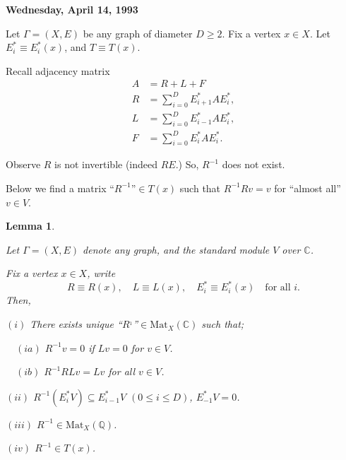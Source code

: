 \documentclass[
]{book}
\newtheorem{lemma}{Lemma}[chapter]
\theoremstyle{definition}
\theoremstyle{definition}
\theoremstyle{definition}
\theoremstyle{definition}
\theoremstyle{remark}
\begin{document}
\textbf{Wednesday, April 14, 1993}

Let \(\Gamma = (X, E)\) be any graph of diameter \(D\geq 2\). Fix a vertex \(x\in X\). Let \(E^*_i\equiv E^*_i(x)\), and \(T \equiv T(x)\).

Recall adjacency matrix
\begin{align}
A & = R + L + F\\
R & = \sum_{i=0}^D E^*_{i+1}AE^*_i,\\
L & = \sum_{i=0}^D E^*_{i-1}AE^*_i,\\
F & = \sum_{i=0}^D E^*_{i}AE^*_i.
\end{align}

Observe \(R\) is not invertible (indeed \(RE%
\).)
So, \(R^{-1}\) does not exist.

Below we find a matrix ``\(R^{-1}\)''\(\in T(x)\) such that \(R^{-1}Rv = v\) for ``almost all'' \(v\in V\).

\begin{lemma}
\protect\hypertarget{lem:inverse-of-r}{}\label{lem:inverse-of-r}

Let \(\Gamma = (X, E)\) denote any graph, and the standard module \(V\) over \(\mathbb{C}\).

Fix a vertex \(x\in X\), write
\[R\equiv R(x), \quad L \equiv L(x), \quad E^*_i\equiv E^*_i(x) \quad \text{for all }i.\]
Then,

\((i)\) There exists unique ``\(R^{_1}\)''\(\in \mathrm{Mat}_X(\mathbb{C})\) such that;

\(\quad (ia)\) \(R^{-1}v = 0\) if \(Lv = 0\) for \(v\in V\).

\(\quad (ib)\) \(R^{-1}RLv = Lv\) for all \(v\in V\).

\((ii)\) \(R^{-1}(E^*_iV)\subseteq E^*_{i-1}V\) \((0\leq i\leq D)\), \(E^*_{-1}V = 0\).

\((iii)\) \(R^{-1}\in \mathrm{Mat}_X(\mathbb{Q})\).

\((iv)\) \(R^{-1}\in T(x)\).

\end{lemma}
\end{document}
